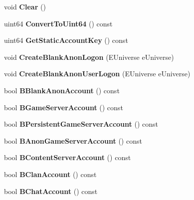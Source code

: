 \begin{DoxyCompactItemize}
void {\bfseries Clear} ()
\item 
\mbox{\label{class_c_steam_i_d_a2a0bce0053828f4d34663e01be2c40f3}} 
uint64 {\bfseries Convert\+To\+Uint64} () const
\item 
\mbox{\label{class_c_steam_i_d_a7310fc2d58e9ee6f0b05bc37a196a42f}} 
uint64 {\bfseries Get\+Static\+Account\+Key} () const
\item 
\mbox{\label{class_c_steam_i_d_a5a29e95bab1b880434b79248a9cafb76}} 
void {\bfseries Create\+Blank\+Anon\+Logon} (E\+Universe e\+Universe)
\item 
\mbox{\label{class_c_steam_i_d_affb4c54f7b3c16815b1befbb7ef860c1}} 
void {\bfseries Create\+Blank\+Anon\+User\+Logon} (E\+Universe e\+Universe)
\item 
\mbox{\label{class_c_steam_i_d_a433ff2eedb9fef4e2743fd677f6ad6f9}} 
bool {\bfseries B\+Blank\+Anon\+Account} () const
\item 
\mbox{\label{class_c_steam_i_d_a7bf411fea66a0bce8a7920c47114b44c}} 
bool {\bfseries B\+Game\+Server\+Account} () const
\item 
\mbox{\label{class_c_steam_i_d_a13bacae5e7f0c7ebf59d9c95e10042e9}} 
bool {\bfseries B\+Persistent\+Game\+Server\+Account} () const
\item 
\mbox{\label{class_c_steam_i_d_a1a84226a66eaf71d7a7fd69266928d01}} 
bool {\bfseries B\+Anon\+Game\+Server\+Account} () const
\item 
\mbox{\label{class_c_steam_i_d_abbdc9c84055e3265dbaa94d8880a0d81}} 
bool {\bfseries B\+Content\+Server\+Account} () const
\item 
\mbox{\label{class_c_steam_i_d_aab186653a385070597aef66294baa08f}} 
bool {\bfseries B\+Clan\+Account} () const
\item 
\mbox{\label{class_c_steam_i_d_a105f757c4fd1a46990b6146359720977}} 
bool {\bfseries B\+Chat\+Account} () const

\end{DoxyCompactItemize}
